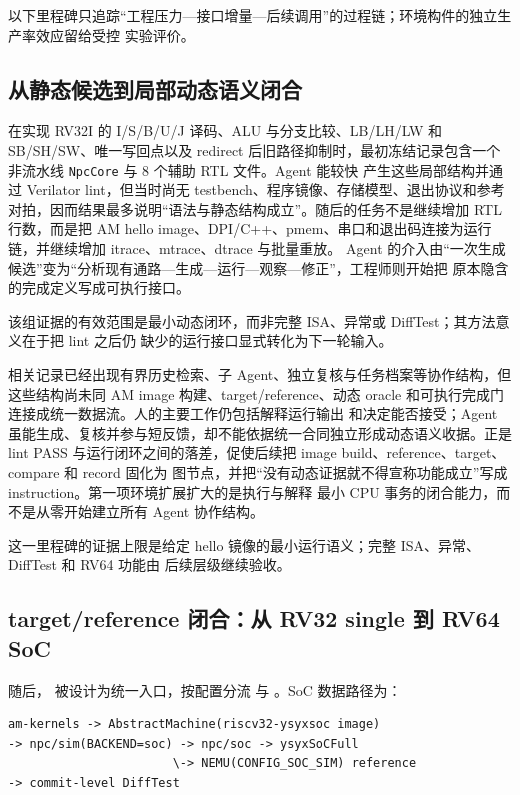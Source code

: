 \documentclass[UTF8,a4paper,zihao=-4,oneside]{ctexart}
\newcommand{\taskpath}[1]{\path{#1}}
\begin{document}
以下里程碑只追踪“工程压力---接口增量---后续调用”的过程链；环境构件的独立生产率效应留给受控
实验评价。

\subsection{从静态候选到局部动态语义闭合}

在实现 RV32I 的 I/S/B/U/J 译码、ALU 与分支比较、LB/LH/LW 和 SB/SH/SW、唯一写回点以及 redirect
后旧路径抑制时，最初冻结记录包含一个非流水线 \texttt{NpcCore} 与 8 个辅助 RTL 文件。Agent 能较快
产生这些局部结构并通过 Verilator lint，但当时尚无 testbench、程序镜像、存储模型、退出协议和参考
对拍，因而结果最多说明“语法与静态结构成立”。随后的任务不是继续增加 RTL 行数，而是把 AM hello
image、DPI/C++、pmem、串口和退出码连接为运行链，并继续增加 itrace、mtrace、dtrace 与批量重放。
Agent 的介入由“一次生成候选”变为“分析现有通路---生成---运行---观察---修正”，工程师则开始把
原本隐含的完成定义写成可执行接口。

该组证据的有效范围是最小动态闭环，而非完整 ISA、异常或 DiffTest；其方法意义在于把 lint 之后仍
缺少的运行接口显式转化为下一轮输入。

相关记录已经出现有界历史检索、子 Agent、独立复核与任务档案等协作结构，但这些结构尚未同 AM image
构建、target/reference、动态 oracle 和可执行完成门连接成统一数据流。人的主要工作仍包括解释运行输出
和决定能否接受；Agent 虽能生成、复核并参与短反馈，却不能依据统一合同独立形成动态语义收据。正是
lint PASS 与运行闭环之间的落差，促使后续把 image build、reference、target、compare 和 record 固化为
图节点，并把“没有动态证据就不得宣称功能成立”写成 instruction。第一项环境扩展扩大的是执行与解释
最小 CPU 事务的闭合能力，而不是从零开始建立所有 Agent 协作结构。

这一里程碑的证据上限是给定 hello 镜像的最小运行语义；完整 ISA、异常、DiffTest 和 RV64 功能由
后续层级继续验收。

\subsection{target/reference 闭合：从 RV32 single 到 RV64 SoC}

随后，\taskpath{npc/sim} 被设计为统一入口，按配置分流 \taskpath{npc/single} 与
\taskpath{npc/soc}。SoC 数据路径为：

\begin{lstlisting}[language={},numbers=none,
  caption={RV32 SoC 的 target/reference 数据流}]
am-kernels -> AbstractMachine(riscv32-ysyxsoc image)
-> npc/sim(BACKEND=soc) -> npc/soc -> ysyxSoCFull
                       \-> NEMU(CONFIG_SOC_SIM) reference
-> commit-level DiffTest
\end{lstlisting}
\end{document}

